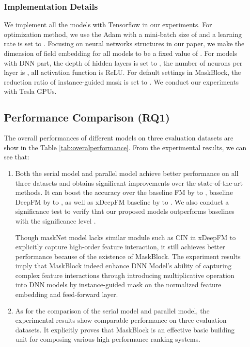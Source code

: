 \documentclass[sigconf]{acmart}
\begin{document}
\subsubsection{Implementation Details}


We implement all the models with Tensorflow in our experiments. For optimization method, we use the Adam with a mini-batch size of  and a learning rate is set to .  Focusing on neural networks structures in our paper, we make the dimension of field embedding for all models to be a fixed value of . For models with DNN part, the depth of hidden layers is set to , the number of neurons per layer is , all activation function is ReLU. For default settings in MaskBlock, the reduction ratio of  instance-guided mask is set to . We conduct our experiments with  Tesla  GPUs.








\subsection{Performance Comparison (RQ1)}
The overall performances of different models on three evaluation datasets are show in the Table \ref{tab:overalperformance}. From the experimental results, we can see that:
\begin{enumerate}
  \item Both the serial model and parallel model achieve  better performance on all three datasets and obtains significant improvements over the state-of-the-art methods. It can boost the accuracy over the baseline FM by  to , baseline DeepFM by  to , as well as  xDeepFM baseline by  to . We also conduct a significance test to verify that our proposed models outperforms baselines with the significance level .


  Though maskNet model lacks similar module such as CIN in xDeepFM to explicitly capture high-order feature interaction, it still achieves better performance because of the existence of MaskBlock. The experiment results imply that MaskBlock indeed  enhance DNN Model's ability of capturing complex feature interactions through introducing multiplicative operation into DNN models by instance-guided mask on the  normalized feature embedding and feed-forward layer.

  \item As for the comparison of the serial model and parallel model, the experimental results show comparable performance on three evaluation datasets. It explicitly proves that MaskBlock is an effective basic building unit for composing various high performance ranking systems.
\end{enumerate}
\end{document}
